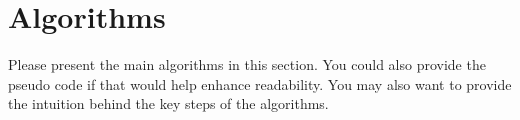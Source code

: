 \section{Algorithms}
\label{section:alg}
Please present the main algorithms in this section. You could also provide the pseudo code if that would help enhance readability. You may also want to provide the intuition behind the key steps of the algorithms.